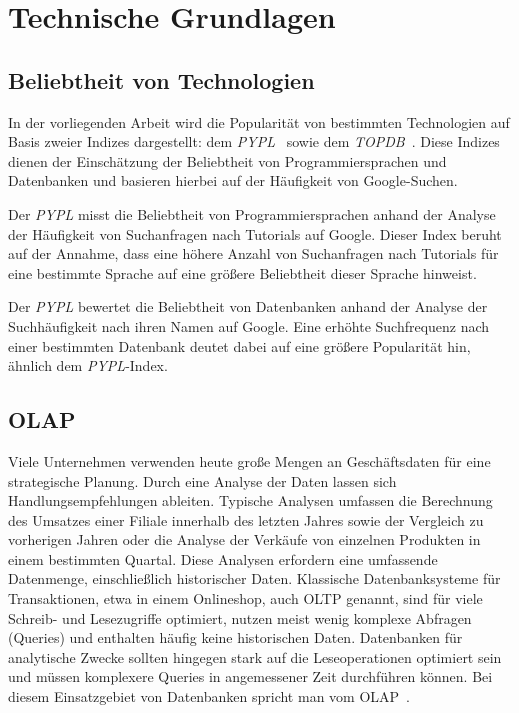 \chapter{Technische Grundlagen}
\section{Beliebtheit von Technologien}
In der vorliegenden Arbeit wird die Popularität von bestimmten Technologien auf Basis zweier Indizes dargestellt: dem \emph{\acf{PYPL}}~\cite{carbonnelle_pypl_2023} sowie dem \emph{\acf{TOPDB}}~\cite{carbonnelle_topdb_2023}.  Diese Indizes dienen der Einschätzung der Beliebtheit von Programmiersprachen und Datenbanken und basieren hierbei auf der Häufigkeit von Google-Suchen.

Der \emph{\acf{PYPL}} misst die Beliebtheit von Programmiersprachen anhand der Analyse der Häufigkeit von Suchanfragen nach Tutorials auf Google. 
Dieser Index beruht auf der Annahme, dass eine höhere Anzahl von Suchanfragen nach Tutorials für eine bestimmte Sprache auf eine größere Beliebtheit dieser Sprache hinweist.

Der \emph{\acf{PYPL}} bewertet die Beliebtheit von Datenbanken anhand der Analyse der Suchhäufigkeit nach ihren Namen auf Google.  Eine erhöhte Suchfrequenz nach einer bestimmten Datenbank deutet dabei auf eine größere Popularität hin, ähnlich dem \emph{PYPL}-Index.

\section{\acf{OLAP}}
Viele Unternehmen verwenden heute große Mengen an Geschäftsdaten für eine strategische Planung.
Durch eine Analyse der Daten lassen sich Handlungsempfehlungen ableiten.
Typische Analysen umfassen die Berechnung des Umsatzes einer Filiale innerhalb des letzten Jahres sowie der Vergleich zu vorherigen Jahren oder die Analyse der Verkäufe von einzelnen Produkten in einem bestimmten Quartal.
Diese Analysen erfordern eine umfassende Datenmenge, einschließlich historischer Daten.
Klassische Datenbanksysteme für Transaktionen, etwa in einem Onlineshop, auch \acf{OLTP} genannt, sind für viele Schreib- und Lesezugriffe optimiert, nutzen meist wenig komplexe Abfragen (Queries) und enthalten häufig keine historischen Daten.
Datenbanken für analytische Zwecke sollten hingegen stark auf die Leseoperationen optimiert sein und müssen komplexere Queries in angemessener Zeit durchführen können.
Bei diesem Einsatzgebiet von Datenbanken spricht man vom \acf{OLAP}~\cite[S.~97f]{kleppmann_datenintensive_2019}.

